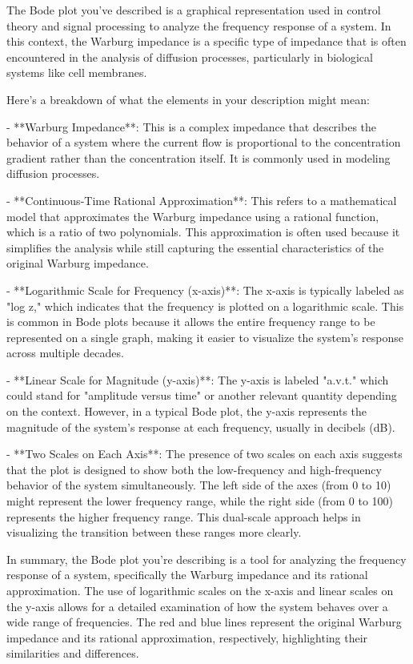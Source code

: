 The Bode plot you've described is a graphical representation used in control theory and signal processing to analyze the frequency response of a system. In this context, the Warburg impedance is a specific type of impedance that is often encountered in the analysis of diffusion processes, particularly in biological systems like cell membranes.

Here's a breakdown of what the elements in your description might mean:

- **Warburg Impedance**: This is a complex impedance that describes the behavior of a system where the current flow is proportional to the concentration gradient rather than the concentration itself. It is commonly used in modeling diffusion processes.
  
- **Continuous-Time Rational Approximation**: This refers to a mathematical model that approximates the Warburg impedance using a rational function, which is a ratio of two polynomials. This approximation is often used because it simplifies the analysis while still capturing the essential characteristics of the original Warburg impedance.

- **Logarithmic Scale for Frequency (x-axis)**: The x-axis is typically labeled as "log z," which indicates that the frequency is plotted on a logarithmic scale. This is common in Bode plots because it allows the entire frequency range to be represented on a single graph, making it easier to visualize the system's response across multiple decades.

- **Linear Scale for Magnitude (y-axis)**: The y-axis is labeled "a.v.t." which could stand for "amplitude versus time" or another relevant quantity depending on the context. However, in a typical Bode plot, the y-axis represents the magnitude of the system's response at each frequency, usually in decibels (dB).

- **Two Scales on Each Axis**: The presence of two scales on each axis suggests that the plot is designed to show both the low-frequency and high-frequency behavior of the system simultaneously. The left side of the axes (from 0 to 10) might represent the lower frequency range, while the right side (from 0 to 100) represents the higher frequency range. This dual-scale approach helps in visualizing the transition between these ranges more clearly.

In summary, the Bode plot you're describing is a tool for analyzing the frequency response of a system, specifically the Warburg impedance and its rational approximation. The use of logarithmic scales on the x-axis and linear scales on the y-axis allows for a detailed examination of how the system behaves over a wide range of frequencies. The red and blue lines represent the original Warburg impedance and its rational approximation, respectively, highlighting their similarities and differences.